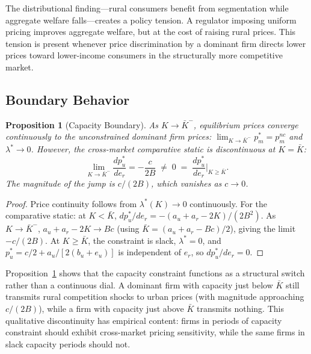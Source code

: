 \documentclass[12pt]{article}
\theoremstyle{plain}
\newtheorem{proposition}{Proposition}
\theoremstyle{definition}
\theoremstyle{remark}
\begin{document}
The distributional finding---rural consumers benefit from segmentation while
aggregate welfare falls---creates a policy tension.  A regulator imposing uniform
pricing improves aggregate welfare, but at the cost of raising rural prices.  This
tension is present whenever price discrimination by a dominant firm directs
lower prices toward lower-income consumers in the structurally more competitive
market.

\subsection{Boundary Behavior}

\begin{proposition}[Capacity Boundary]
\label{prop:boundary}
As $K \to \bar{K}^-$, equilibrium prices converge continuously to the
unconstrained dominant firm prices: $\lim_{K \to \bar{K}^-} p_m^* = p_m^{nc}$
and $\lambda^* \to 0$.  However, the cross-market comparative static is
discontinuous at $K = \bar{K}$:
\begin{equation}
  \lim_{K \to \bar{K}^-} \frac{dp_u^*}{de_r} = -\frac{c}{2B} \;\neq\; 0
  \;=\; \frac{dp_u^*}{de_r}\bigg|_{K \geq \bar{K}}.
  \label{eq:boundary}
\end{equation}
The magnitude of the jump is $c/(2B)$, which vanishes as $c \to 0$.
\end{proposition}

\begin{proof}
Price continuity follows from $\lambda^*(K) \to 0$ continuously.  For the
comparative static: at $K < \bar{K}$,
$dp_u^*/de_r = -(a_u + a_r - 2K)/(2B^2)$.  As $K \to \bar{K}^-$, $a_u + a_r - 2K \to Bc$
(using $\bar{K} = (a_u + a_r - Bc)/2$), giving the limit $-c/(2B)$.  At
$K \geq \bar{K}$, the constraint is slack, $\lambda^* = 0$, and $p_u^* = c/2 +
a_u/[2(b_u + e_u)]$ is independent of $e_r$, so $dp_u^*/de_r = 0$.
\end{proof}

Proposition~\ref{prop:boundary} shows that the capacity constraint functions as
a structural switch rather than a continuous dial.  A dominant firm with capacity
just below $\bar{K}$ still transmits rural competition shocks to urban prices
(with magnitude approaching $c/(2B)$), while a firm with capacity just above
$\bar{K}$ transmits nothing.  This qualitative discontinuity has empirical content:
firms in periods of capacity constraint should exhibit cross-market pricing
sensitivity, while the same firms in slack capacity periods should not.
\end{document}
